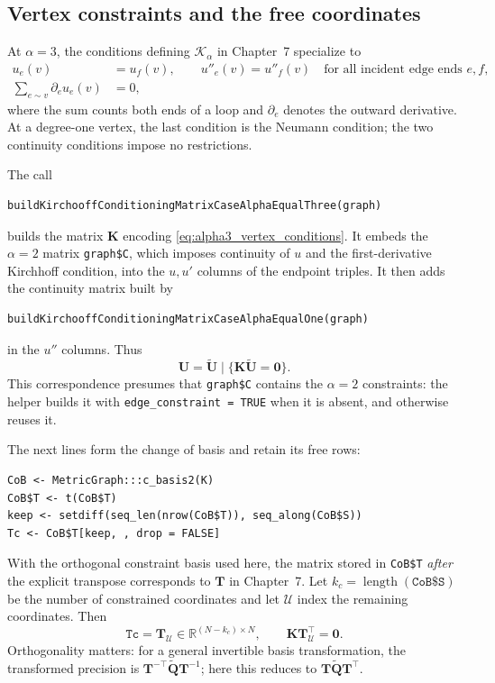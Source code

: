 \documentclass[11pt,a4paper]{article}
\theoremstyle{plain}
\theoremstyle{definition}
\begin{document}
\subsection{Vertex constraints and the free coordinates}

At $\alpha=3$, the conditions defining $\mathcal K_\alpha$ in Chapter~7
specialize to
\begin{equation}
\begin{split}
u_e(v)&=u_f(v),\qquad u''_e(v)=u''_f(v)
       \quad\text{for all incident edge ends }e,f,\\
\sum_{e\sim v}\partial_e u_e(v)&=0,
\end{split}
\label{eq:alpha3_vertex_conditions}
\end{equation}
where the sum counts both ends of a loop and $\partial_e$ denotes the
outward derivative. At a degree-one vertex, the last condition is the
Neumann condition; the two continuity conditions impose no restrictions.

The call
\begin{verbatim}
buildKirchooffConditioningMatrixCaseAlphaEqualThree(graph)
\end{verbatim}
builds the matrix $\mathbf K$ encoding
\eqref{eq:alpha3_vertex_conditions}. It embeds the $\alpha=2$ matrix
\texttt{graph\$C}, which imposes continuity of $u$ and the first-derivative
Kirchhoff condition, into the $u,u'$ columns of the endpoint triples.
It then adds the continuity matrix built by
\begin{verbatim}
buildKirchooffConditioningMatrixCaseAlphaEqualOne(graph)
\end{verbatim}
in the $u''$ columns. Thus
\begin{equation}
\mathbf U=\widetilde{\mathbf U}\mid
\{\mathbf K\widetilde{\mathbf U}=\mathbf0\}.
\end{equation}
This correspondence presumes that \texttt{graph\$C} contains the
$\alpha=2$ constraints: the helper builds it with
\texttt{edge\_constraint = TRUE} when it is absent, and otherwise reuses it.

The next lines form the change of basis and retain its free rows:
\begin{verbatim}
CoB <- MetricGraph:::c_basis2(K)
CoB$T <- t(CoB$T)
keep <- setdiff(seq_len(nrow(CoB$T)), seq_along(CoB$S))
Tc <- CoB$T[keep, , drop = FALSE]
\end{verbatim}
With the orthogonal constraint basis used here, the matrix stored in
\texttt{CoB\$T} \emph{after} the explicit transpose corresponds to
$\mathbf T$ in Chapter~7. Let $k_c=\operatorname{length}(\texttt{CoB\$S})$
be the number of constrained coordinates and let $\mathcal U$ index the
remaining coordinates. Then
\begin{equation}
\texttt{Tc}=\mathbf T_{\mathcal U}\in\mathbb R^{(N-k_c)\times N},
\qquad
\mathbf K\mathbf T_{\mathcal U}^\top=\mathbf0.
\end{equation}
Orthogonality matters: for a general invertible basis transformation,
the transformed precision is
$\mathbf T^{-\top}\widetilde{\mathbf Q}\mathbf T^{-1}$; here this reduces
to $\mathbf T\widetilde{\mathbf Q}\mathbf T^\top$.
\end{document}
